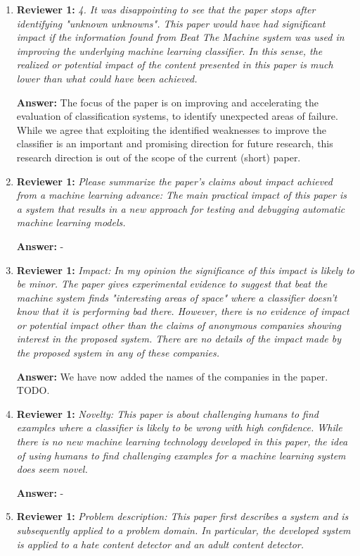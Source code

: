 \documentclass[letterpaper]{article}
\begin{document}
\begin{enumerate}
\item \textbf{Reviewer 1:} \emph{ 4. It was disappointing to see that the paper stops after identifying "unknown unknowns". This paper would have had significant impact  if the information found from Beat The Machine system was used in improving the underlying machine learning classifier.  In this sense, the realized or potential impact of the content presented in this paper is much lower than what could have been achieved.}

\textbf{Answer:} The focus of the paper is on improving and accelerating the evaluation of classification systems, to identify unexpected areas of failure. While we agree that exploiting the identified weaknesses to improve the classifier is an important and promising direction for future research, this research direction is out of the scope of the current (short) paper.

\item \textbf{Reviewer 1:} \emph{ Please summarize the paper's claims about impact achieved from a machine learning advance: The main practical impact of this paper is a system that results in a new approach for testing and debugging automatic machine learning models.}

\textbf{Answer:} -

\item \textbf{Reviewer 1:} \emph{Impact: In my opinion the significance of this impact is likely to be minor. The paper gives experimental evidence to suggest that beat the machine system finds "interesting areas of space" where a classifier doesn't know that it is performing bad there. However, there is no evidence of impact  or potential impact other than the claims of anonymous companies showing interest in the proposed system. There are no details of the impact made by the proposed system in any of these companies.}

\textbf{Answer:} We have now added the names of the companies in the paper. TODO.

\item \textbf{Reviewer 1:} \emph{Novelty: This paper is about challenging humans to find examples where a classifier is likely to be wrong with high confidence. While there is no new machine learning technology developed in this paper, the idea of using humans to find challenging examples for a machine learning system does seem novel.}

\textbf{Answer:} -

\item \textbf{Reviewer 1:} \emph{Problem description: This paper first describes a system and is subsequently applied to a problem domain. In particular, the developed system is applied to a hate content detector and an adult content detector.}


\end{enumerate}
\end{document}
